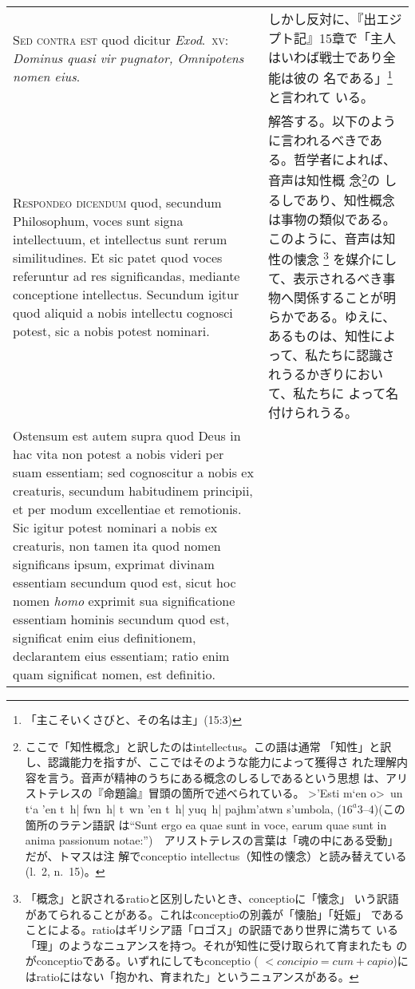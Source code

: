 \documentclass[paper=a4paper,fontsize=10pt,jafontsize=9pt,titlepage]{jlreq}
\begin{document}
\begin{longtable}{p{21em}p{21em}}
\\

{\scshape Sed contra est} quod dicitur {\itshape Exod}.\ {\scshape xv}: {\itshape Dominus
quasi vir pugnator, Omnipotens nomen eius}.

&

しかし反対に、『出エジプト記』15章で「主人はいわば戦士であり全能は彼の
名である」\footnote{「主こそいくさびと、その名は主」(15:3)}と言われて
いる。

\\

{\scshape Respondeo dicendum} quod, secundum Philosophum, voces sunt signa
intellectuum, et intellectus sunt rerum similitudines. Et sic patet
quod voces referuntur ad res significandas, mediante conceptione
intellectus. Secundum igitur quod aliquid a nobis intellectu cognosci
potest, sic a nobis potest nominari.

&

解答する。以下のように言われるべきである。哲学者によれば、音声は知性概
念\footnote{ここで「知性概念」と訳したのはintellectus。この語は通常
「知性」と訳し、認識能力を指すが、ここではそのような能力によって獲得さ
れた理解内容を言う。音声が精神のうちにある概念のしるしであるという思想
は、アリストテレスの『命題論』冒頭の箇所で述べられている。
\foreignlanguage{greek}{>'Esti m`en o>~un t`a 'en t~h| fwn~h| t~wn 'en
t~h| yuq~h| pajhm'atwn s'umbola,} ($16^{a}3$--4)(この箇所のラテン語訳
は``Sunt ergo ea quae sunt in voce, earum quae sunt in anima passionum
notae:'')　アリストテレスの言葉は「魂の中にある受動」だが、トマスは注
解でconceptio intellectus（知性の懐念）と読み替えている(l.~2, n.~15)。}の
しるしであり、知性概念は事物の類似である。このように、音声は知性の懐念
\footnote{「概念」と訳されるratioと区別したいとき、conceptioに「懐念」
いう訳語があてられることがある。これはconceptioの別義が「懐胎」「妊娠」
であることによる。ratioはギリシア語「ロゴス」の訳語であり世界に満ちて
いる「理」のようなニュアンスを持つ。それが知性に受け取られて育まれたも
のがconceptioである。いずれにしてもconceptio ( $< concipio = cum +
capio$)にはratioにはない「抱かれ、育まれた」というニュアンスがある。}
を媒介にして、表示されるべき事物へ関係することが明らかである。ゆえに、
あるものは、知性によって、私たちに認識されうるかぎりにおいて、私たちに
よって名付けられうる。

\\

Ostensum est autem supra quod Deus in hac vita non potest a nobis
videri per suam essentiam; sed cognoscitur a nobis ex creaturis,
secundum habitudinem principii, et per modum excellentiae et
remotionis. Sic igitur potest nominari a nobis ex creaturis, non tamen
ita quod nomen significans ipsum, exprimat divinam essentiam secundum
quod est, sicut hoc nomen {\itshape homo} exprimit sua significatione
essentiam hominis secundum quod est, significat enim eius
definitionem, declarantem eius essentiam; ratio enim quam significat
nomen, est definitio.


\end{longtable}
\end{document}
